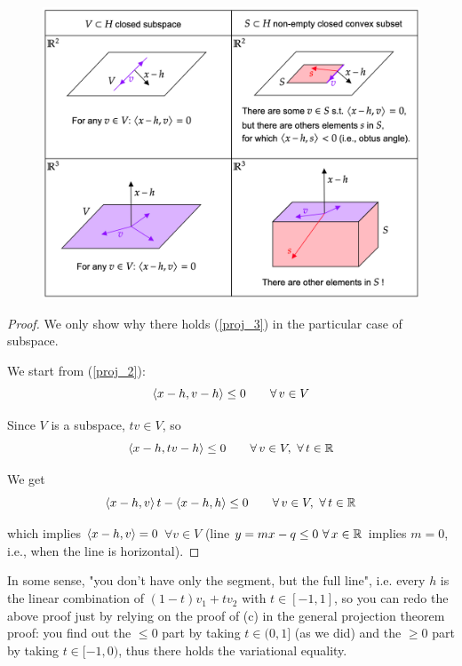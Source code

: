 \begin{figure}[H]
\begin{center}
  \includegraphics[width=14cm]{images/bonfa_1439.png}
\end{center}
\caption{}
\label{proj_fig3}
\end{figure}

\begin{proof}
We only show why there holds (\ref{proj_3}) in the particular case of subspace.

We start from (\ref{proj_2}):
\begin{equation*}
    \sca{x-h,v-h}\leq 0 \qquad \forall v\in V
\end{equation*}

Since $V$ is a subspace, $tv\in V$, so
\begin{equation*}
\sca{x-h,tv-h}\leq 0 \qquad \forall v\in V,\ \forall t\in\RR
\end{equation*}

We get
\begin{equation*}
    \sca{x-h,v}t-\sca{x-h,h}\leq 0 \qquad \forall v\in V,\ \forall t\in\RR
\end{equation*}

which implies $\left\langle x-h,v \right\rangle=0$ $\forall v\in V$ (line $y=mx-q\leq 0\ \forall x\in \RR$ implies $m=0$, i.e., when the line is horizontal).
\end{proof}

\begin{subtle}
In some sense, "you don't have only the segment, but the full line", i.e. every $h$ is the linear combination of $(1-t)v_1+tv_2$ with $t\in[-1,1]$, so you can redo the above proof just by relying on the proof of (c) in the general projection theorem proof: you find out the $\leq 0$ part by taking $t\in (0,1]$ (as we did) and the $\geq 0$ part by taking $t\in[-1,0)$, thus there holds the variational equality. 
\end{subtle}

